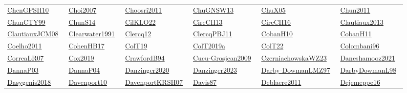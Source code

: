 \begin{longtable}{*{6}{l}}
\href{../works/ChenGPSH10.pdf}{ChenGPSH10}~\cite{ChenGPSH10} & \href{../}{Choi2007}~\cite{Choi2007} & \href{../}{Choosri2011}~\cite{Choosri2011} & \href{../works/ChuGNSW13.pdf}{ChuGNSW13}~\cite{ChuGNSW13} & \href{../works/ChuX05.pdf}{ChuX05}~\cite{ChuX05} & \href{../}{Chun2011}~\cite{Chun2011}\\ 
\href{../works/ChunCTY99.pdf}{ChunCTY99}~\cite{ChunCTY99} & \href{../works/ChunS14.pdf}{ChunS14}~\cite{ChunS14} & \href{../works/CilKLO22.pdf}{CilKLO22}~\cite{CilKLO22} & \href{../works/CireCH13.pdf}{CireCH13}~\cite{CireCH13} & \href{../works/CireCH16.pdf}{CireCH16}~\cite{CireCH16} & \href{../}{Clautiaux2013}~\cite{Clautiaux2013}\\ 
\href{../works/ClautiauxJCM08.pdf}{ClautiauxJCM08}~\cite{ClautiauxJCM08} & \href{../}{Clearwater1991}~\cite{Clearwater1991} & \href{../works/Clercq12.pdf}{Clercq12}~\cite{Clercq12} & \href{../works/ClercqPBJ11.pdf}{ClercqPBJ11}~\cite{ClercqPBJ11} & \href{../works/CobanH10.pdf}{CobanH10}~\cite{CobanH10} & \href{../works/CobanH11.pdf}{CobanH11}~\cite{CobanH11}\\ 
\href{../}{Coelho2011}~\cite{Coelho2011} & \href{../works/CohenHB17.pdf}{CohenHB17}~\cite{CohenHB17} & \href{../works/ColT19.pdf}{ColT19}~\cite{ColT19} & \href{../works/ColT2019a.pdf}{ColT2019a}~\cite{ColT2019a} & \href{../works/ColT22.pdf}{ColT22}~\cite{ColT22} & \href{../works/Colombani96.pdf}{Colombani96}~\cite{Colombani96}\\ 
\href{../works/CorreaLR07.pdf}{CorreaLR07}~\cite{CorreaLR07} & \href{../}{Cox2019}~\cite{Cox2019} & \href{../works/CrawfordB94.pdf}{CrawfordB94}~\cite{CrawfordB94} & \href{../}{Cucu-Grosjean2009}~\cite{Cucu-Grosjean2009} & \href{../works/CzerniachowskaWZ23.pdf}{CzerniachowskaWZ23}~\cite{CzerniachowskaWZ23} & \href{../}{Daneshamooz2021}~\cite{Daneshamooz2021}\\ 
\href{../works/DannaP03.pdf}{DannaP03}~\cite{DannaP03} & \href{../}{DannaP04}~\cite{DannaP04} & \href{../}{Danzinger2020}~\cite{Danzinger2020} & \href{../}{Danzinger2023}~\cite{Danzinger2023} & \href{../works/Darby-DowmanLMZ97.pdf}{Darby-DowmanLMZ97}~\cite{Darby-DowmanLMZ97} & \href{../}{DarbyDowmanL98}~\cite{DarbyDowmanL98}\\ 
\href{../}{Dasygenis2018}~\cite{Dasygenis2018} & \href{../works/Davenport10.pdf}{Davenport10}~\cite{Davenport10} & \href{../works/DavenportKRSH07.pdf}{DavenportKRSH07}~\cite{DavenportKRSH07} & \href{../works/Davis87.pdf}{Davis87}~\cite{Davis87} & \href{../}{Deblaere2011}~\cite{Deblaere2011} & \href{../works/Dejemeppe16.pdf}{Dejemeppe16}~\cite{Dejemeppe16}\\ 

\end{longtable}
